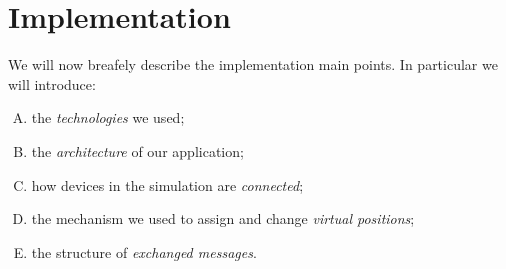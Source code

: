 \section{Implementation}

We will now breafely describe the implementation main points. In particular we will introduce:
	\begin{enumerate}[A.]
		\item the \textit{technologies} we used;
		\item the \textit{architecture} of our application;
		\item how devices in the simulation are \textit{connected};
		\item the mechanism we used to assign and change \textit{virtual positions};
		\item the structure of \textit{exchanged messages}.
	\end{enumerate}





